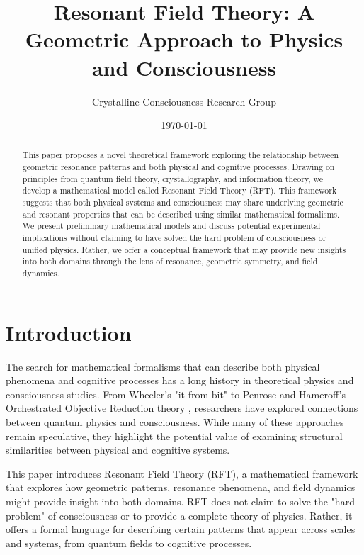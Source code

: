 \documentclass[12pt,letterpaper]{article}
\begin{document}
\title{\textcolor{crystal}{\Large \textbf{Resonant Field Theory: A Geometric Approach to Physics and Consciousness}}}
\author{Crystalline Consciousness Research Group}
\date{\today}

\maketitle
\tableofcontents

\begin{abstract}
This paper proposes a novel theoretical framework exploring the relationship between geometric resonance patterns and both physical and cognitive processes. Drawing on principles from quantum field theory, crystallography, and information theory, we develop a mathematical model called Resonant Field Theory (RFT). This framework suggests that both physical systems and consciousness may share underlying geometric and resonant properties that can be described using similar mathematical formalisms. We present preliminary mathematical models and discuss potential experimental implications without claiming to have solved the hard problem of consciousness or unified physics. Rather, we offer a conceptual framework that may provide new insights into both domains through the lens of resonance, geometric symmetry, and field dynamics.
\end{abstract}

\section{Introduction}
\label{sec:introduction}

The search for mathematical formalisms that can describe both physical phenomena and cognitive processes has a long history in theoretical physics and consciousness studies. From Wheeler's "it from bit" \cite{wheeler1990information} to Penrose and Hameroff's Orchestrated Objective Reduction theory \cite{hameroff2014consciousness}, researchers have explored connections between quantum physics and consciousness. While many of these approaches remain speculative, they highlight the potential value of examining structural similarities between physical and cognitive systems.

This paper introduces Resonant Field Theory (RFT), a mathematical framework that explores how geometric patterns, resonance phenomena, and field dynamics might provide insight into both domains. RFT does not claim to solve the "hard problem" of consciousness \cite{chalmers1995facing} or to provide a complete theory of physics. Rather, it offers a formal language for describing certain patterns that appear across scales and systems, from quantum fields to cognitive processes.
\end{document}
